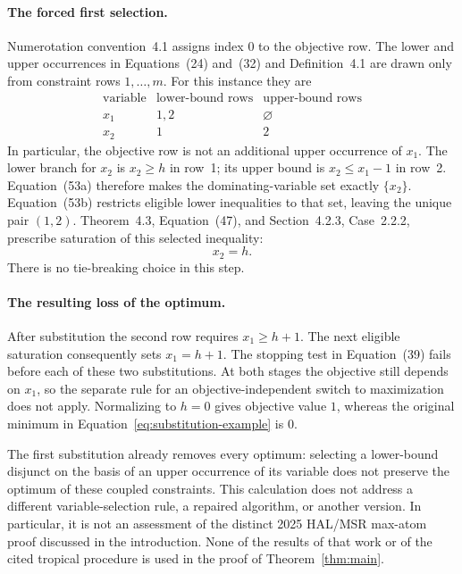\paragraph{The forced first selection.}
Numerotation convention~4.1 assigns index $0$ to the objective row.
The lower and upper occurrences in Equations~(24) and~(32) and
Definition~4.1 are drawn only from constraint rows $1,\ldots,m$.
For this instance they are
\[
 \begin{array}{c|c|c}
 \text{variable}&\text{lower-bound rows}&\text{upper-bound rows}\\\hline
 x_1&1,2&\varnothing\\
 x_2&1&2
 \end{array}
\]
In particular, the objective row is not an additional upper occurrence
of $x_1$. The lower branch for $x_2$ is $x_2\ge h$ in row~1; its
upper bound is $x_2\le x_1-1$ in row~2. Equation~(53a) therefore
makes the dominating-variable set exactly $\{x_2\}$. Equation~(53b)
restricts eligible lower inequalities to that set, leaving the unique
pair $(1,2)$. Theorem~4.3, Equation~(47), and Section~4.2.3,
Case~2.2.2, prescribe saturation of this selected inequality:
\[
 x_2=h.
\]
There is no tie-breaking choice in this step.

\paragraph{The resulting loss of the optimum.}
After substitution the second row requires $x_1\ge h+1$. The next
eligible saturation consequently sets $x_1=h+1$. The stopping test in
Equation~(39) fails before each of these two substitutions. At both
stages the objective still depends on $x_1$, so the separate rule for
an objective-independent switch to maximization does not apply.
Normalizing to $h=0$ gives objective value $1$, whereas the original
minimum in Equation~\eqref{eq:substitution-example} is $0$.

The first substitution already removes every optimum: selecting a
lower-bound disjunct on the basis of an upper occurrence of its variable
does not preserve the optimum of these coupled constraints. This
calculation does not address a different variable-selection rule, a
repaired algorithm, or another version. In particular, it is not an
assessment of the distinct 2025 HAL/MSR max-atom proof discussed in the
introduction. None of the results of that work or of the cited tropical
procedure is used in the proof of Theorem~\ref{thm:main}.
